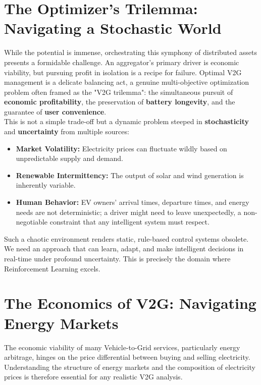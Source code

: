 \section{The Optimizer's Trilemma: Navigating a Stochastic World}
While the potential is immense, orchestrating this symphony of distributed assets presents a formidable challenge. An aggregator's primary driver is economic viability, but pursuing profit in isolation is a recipe for failure. Optimal V2G management is a delicate balancing act, a genuine multi-objective optimization problem often framed as the "V2G trilemma": the simultaneous pursuit of \textbf{economic profitability}, the preservation of \textbf{battery longevity}, and the guarantee of \textbf{user convenience}.
\\
\noindent
This is not a simple trade-off but a dynamic problem steeped in \textbf{stochasticity} and \textbf{uncertainty} from multiple sources:
\begin{itemize}
    \item \textbf{Market Volatility:} Electricity prices can fluctuate wildly based on unpredictable supply and demand.
    \item \textbf{Renewable Intermittency:} The output of solar and wind generation is inherently variable.
    \item \textbf{Human Behavior:} EV owners' arrival times, departure times, and energy needs are not deterministic; a driver might need to leave unexpectedly, a non-negotiable constraint that any intelligent system must respect.
\end{itemize}
Such a chaotic environment renders static, rule-based control systems obsolete. We need an approach that can learn, adapt, and make intelligent decisions in real-time under profound uncertainty. This is precisely the domain where Reinforcement Learning excels.

\section{The Economics of V2G: Navigating Energy Markets}
\label{sec:v2g_economics}
The economic viability of many Vehicle-to-Grid services, particularly energy arbitrage, hinges on the price differential between buying and selling electricity. Understanding the structure of energy markets and the composition of electricity prices is therefore essential for any realistic V2G analysis.

